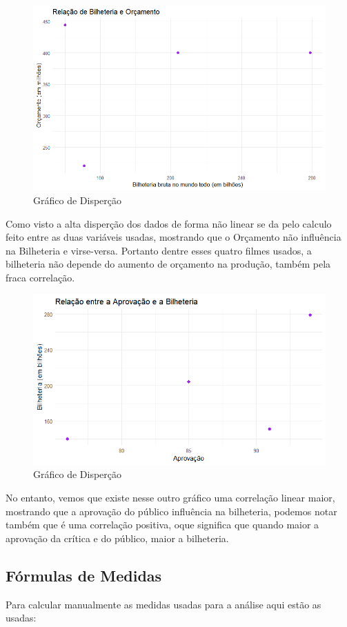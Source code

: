 \documentclass[
    12pt,                  %
    openright,             %
    oneside,               %
    a4paper,               %
    chapter=TITLE,         %
    section=TITLE,         %
    brazil                 %
]{abntex2}                 %
\begin{document}
\begin{figure}[h]
    \centering
    \includegraphics[width=0.70\linewidth]{Disperção_BIlheteria.Orçamento.png}
    \caption{Gráfico de Disperção}
    \label{fig:enter-label}
\end{figure}

\noindent Como visto a alta disperção dos dados de forma não linear se da pelo calculo feito entre as duas variáveis usadas, mostrando que o Orçamento não influência na Bilheteria e virse-versa. Portanto dentre esses quatro filmes usados, a bilheteria não depende do aumento de orçamento na produção, também pela fraca correlação.

\begin{figure}
    \centering
    \includegraphics[width=0.70\linewidth]{Disperção_Aprovação.Bilheteria.png}
    \caption{Gráfico de Disperção}
    \label{fig:enter-label}
\end{figure}
\newpage
\noindent No entanto, vemos que existe nesse outro gráfico uma correlação linear maior, mostrando que a aprovação do público influência na bilheteria, podemos notar também que é uma correlação positiva, oque significa que quando maior a aprovação da crítica e do público, maior a bilheteria.

\subsection{Fórmulas de Medidas}
Para calcular manualmente as medidas usadas para a análise aqui estão as usadas: \\
\vspace{0.3cm}
\end{document}
